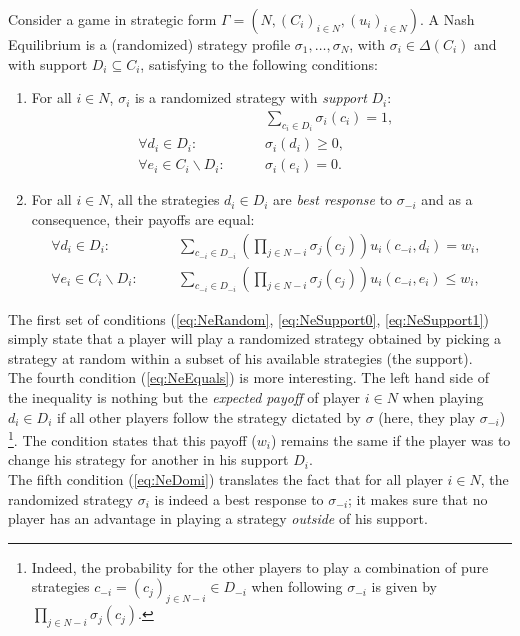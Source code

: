 \begin{definition}
Consider a game in strategic form $\Gamma = \left (N, (C_i)_{i \in N}, (u_i)_{i \in N} \right).$  A Nash Equilibrium is a (randomized) strategy profile $\sigma_1, \ldots, \sigma_N$, with $\sigma_i \in \Delta(C_i)$ and with support $D_i \subseteq C_i$, satisfying to the following conditions:
\begin{enumerate}
\item For all $i \in N$, $\sigma_i$ is a randomized strategy with \emph{support} $D_i$:
\begin{align}
& \qquad \sum_{c_i \in D_i} \sigma_i(c_i) = 1,&
\label{eq:NeRandom}\\
\forall d_i \in D_i:  &\qquad \sigma_i(d_i) \geq 0, &
\label{eq:NeSupport0} \\
\forall e_i \in C_i \backslash D_i: & \qquad\sigma_i(e_i) = 0.  &
\label{eq:NeSupport1} 
\end{align}
\item For all $i \in  N$,  all the strategies $d_i \in D_i$ are \emph{best response} to $\sigma_{-i}$ and as a consequence, their payoffs are equal:
\begin{align}
\forall d_i \in D_i: & \qquad  \sum_{c_{-i} \in D_{-i}} \left  ( \prod_{j \in N-i} \sigma_j(c_j) \right ) u_i(c_{-i}, d_i) = w_i, & 
\label{eq:NeEquals} \\
\forall e_i \in C_i \backslash D_i: & \qquad \sum_{c_{-i} \in D_{-i}} \left  ( \prod_{j \in N-i} \sigma_j(c_j) \right ) u_i(c_{-i}, e_i) \leq w_i, & 
\label{eq:NeDomi}
\end{align}
\end{enumerate}
\label{def:nash}
\end{definition}

The first set of conditions (\ref{eq:NeRandom}, \ref{eq:NeSupport0}, \ref{eq:NeSupport1}) simply state that a player will play a randomized strategy obtained by picking a strategy at random within a subset of his available strategies (the support). \\
The fourth condition (\ref{eq:NeEquals}) is more interesting. The left hand side of the inequality is nothing but the \emph{expected payoff} of player $i \in N$ when playing $d_i \in D_i$ if all other players follow the strategy dictated by $\sigma$ (here, they play $\sigma_{-i}$) \footnote{Indeed, the probability for the other players to play a combination of pure strategies $c_{-i} = (c_j)_{j \in N-i} \in D_{-i}$ when following $\sigma_{-i}$ is given by $\prod_{j \in N-i} \sigma_j(c_j).$ }. 
The condition states that this payoff ($w_i$) remains the same if the player was to change his strategy for another in his support $D_i$.\\
The fifth condition (\ref{eq:NeDomi}) translates the fact that for all player $i \in N$, the randomized strategy $\sigma_{i}$ is indeed a best response to $\sigma_{-i}$; it makes sure that no player has an advantage in playing a strategy \emph{outside} of his support.  


